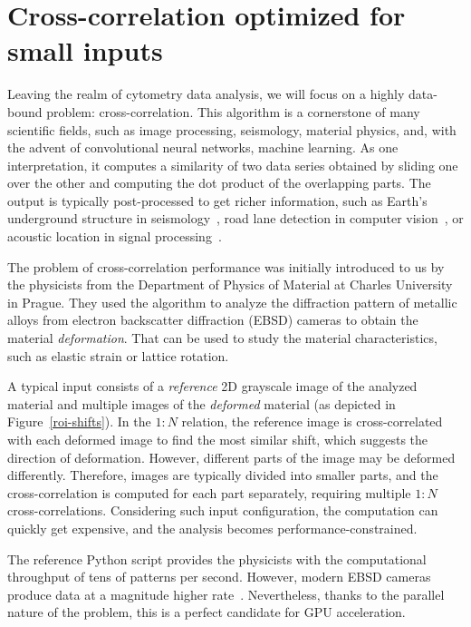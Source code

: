 \section{Cross-correlation optimized for small inputs}

Leaving the realm of cytometry data analysis, we will focus on a highly data-bound problem: cross-correlation. This algorithm is a cornerstone of many scientific fields, such as image processing, seismology, material physics, and, with the advent of convolutional neural networks, machine learning. As one interpretation, it computes a similarity of two data series obtained by sliding one over the other and computing the dot product of the overlapping parts. The output is typically post-processed to get richer information, such as Earth's underground structure in seismology~\cite{zhou2021high}, road lane detection in computer vision~\cite{fan2018real}, or acoustic location in signal processing~\cite{belloch2015performance}.

The problem of cross-correlation performance was initially introduced to us by the physicists from the Department of Physics of Material at Charles University in Prague. They used the algorithm to analyze the diffraction pattern of metallic alloys from electron backscatter diffraction (EBSD) cameras to obtain the material \emph{deformation}. That can be used to study the material characteristics, such as elastic strain or lattice rotation.

A typical input consists of a \emph{reference} 2D grayscale image of the analyzed material and multiple images of the \emph{deformed} material (as depicted in Figure~\ref{roi-shifts}). In the $1:N$ relation, the reference image is cross-correlated with each deformed image to find the most similar shift, which suggests the direction of deformation. However, different parts of the image may be deformed differently. Therefore, images are typically divided into smaller parts, and the cross-correlation is computed for each part separately, requiring multiple $1:N$ cross-correlations. Considering such input configuration, the computation can quickly get expensive, and the analysis becomes performance-constrained.

The reference Python script provides the physicists with the computational throughput of tens of patterns per second. However, modern EBSD cameras produce data at a magnitude higher rate~\cite{bali2021zpracovani}. Nevertheless, thanks to the parallel nature of the problem, this is a perfect candidate for GPU acceleration. 

